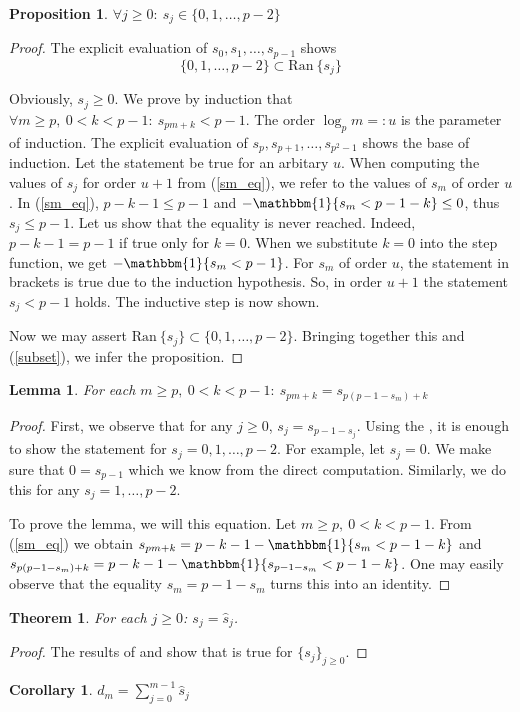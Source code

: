 \documentclass[a4paper]{article}
\theoremstyle{plain}
\newtheorem{theorem}{Theorem}[section]
\newtheorem{lemma}{Lemma}[section]
\newtheorem{proposition}{Proposition}[section]
\newtheorem{corollary}{Corollary}[section]
\theoremstyle{definition}
\begin{document}
\begin{proposition} \label{sm_estimate}
$\forall j \ge 0:\ s_j \in \{0, 1, \ldots, p-2\}$
\end{proposition}
\begin{proof}
The explicit evaluation of $s_0, s_1, \ldots, s_{p-1}$ shows 
\begin{equation}\label{subset}
\{0,1,\ldots,p-2\} \subset \mathrm{Ran\ } \{s_j\}
\end{equation}

Obviously, $s_j \ge 0$.
We prove by induction that $\forall m \ge p,\ 0 < k < p-1:\ s_{pm+k} < p-1$. The order $\log_p m =: u $ is the parameter of induction. The explicit evaluation of $s_p, s_{p+1}, \ldots, s_{p^2-1}$ shows the base of induction. Let the statement be true for an arbitary $u$. When computing the values of $s_j$ for order $u+1$ from (\ref{sm_eq}), we refer to the values of $s_m$ of order $u$. In (\ref{sm_eq}), $p-k-1 \le p-1$ and $- \mathbbm{1}\{s_m < p-1-k\} \le 0$, thus $s_j \le p-1$. Let us show that the equality is never reached. Indeed, $p-k-1 = p-1$ if true only for $k=0$. When we substitute $k=0$ into the step function, we get $- \mathbbm{1}\{s_m < p-1\}$. For $s_m$ of order $u$, the statement in brackets is true due to the induction hypothesis. So, in order $u+1$ the statement $s_j < p-1$ holds. The inductive step is now shown.

Now we may assert $\mathrm{Ran}\ \{s_j\} \subset \{0,1,\ldots,p-2\}$. Bringing together this and (\ref{subset}), we infer the proposition.
\end{proof}
\begin{lemma} \label{sm2}
For each $m \ge p,\ 0 < k < p-1:\ s_{pm+k}=s_{p(p-1-s_m)+k}$
\end{lemma}
\begin{proof}
First, we observe that for any $j \ge 0$, $s_j = s_{p-1 - s_j}$. Using the , it is enough to show the statement for $s_j=0,1,\ldots,p-2$. For example, let $s_j=0$. We make sure that $0 = s_{p-1}$ which we know from the direct computation. Similarly, we do this for any $s_j=1,\ldots,p-2$.

To prove the lemma, we will this equation. Let $m \ge p,\ 0 < k < p-1$. From (\ref{sm_eq}) we obtain $s_{pm+k}=p-k-1 - \mathbbm{1}\{s_m < p-1-k\}$ and $s_{p(p-1-s_m)+k}= p-k-1 - \mathbbm{1}\{s_{p-1-s_m} < p-1-k\}$. One may easily observe that the equality $s_m=p-1-s_m$ turns this into an identity.
\end{proof}
\begin{theorem}
For each $j \ge 0$: $s_j=\hat{s}_j$.
\end{theorem}
\begin{proof}
The results of  and  show that  is true for $\{s_j\}_{j \ge 0}$.
\end{proof}
\begin{corollary}
$d_m = \sum\limits_{j=0}^{m-1} \hat{s}_j$
\end{corollary}
\end{document}
